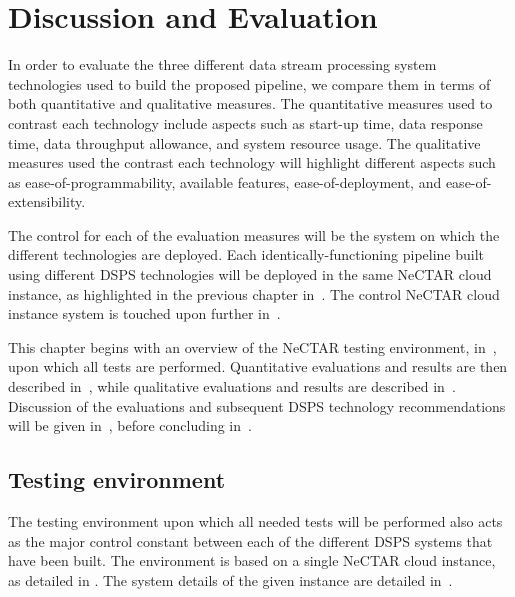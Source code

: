 \section{Discussion and Evaluation}
\label{sec:evaluation}

In order to evaluate the three different data stream processing system technologies used to build the proposed pipeline,
we compare them in terms of both quantitative and qualitative measures. The quantitative measures used to contrast
each technology include aspects such as start-up time, data response time, data throughput allowance, and system resource
usage. The qualitative measures used the contrast each technology will highlight different aspects such as ease-of-programmability,
available features, ease-of-deployment, and ease-of-extensibility.

The control for each of the evaluation measures will be the system on which the different technologies are deployed.
Each identically-functioning pipeline built using different DSPS technologies will be deployed in the same NeCTAR cloud
instance, as highlighted in the previous chapter in~.
The control NeCTAR cloud instance system is touched upon further in~.

This chapter begins with an overview of the NeCTAR testing environment, in~, upon which
all tests are performed. Quantitative evaluations and results are then described in~,
while qualitative evaluations and results are described in~. Discussion of the
evaluations and subsequent DSPS technology recommendations will be given in~,
before concluding in~.


\subsection{Testing environment} %
\label{sub:testing_environment}

The testing environment upon which all needed tests will be performed also acts as the major control constant between
each of the different DSPS systems that have been built. The environment is based on a single NeCTAR cloud instance, as detailed
in%
. The system details of the given instance are detailed in~.

